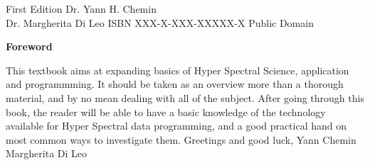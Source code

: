 \documentclass[10pt]{book}
\begin{document}
First Edition\newline\linebreak
Dr. Yann H. Chemin\\Dr. Margherita Di Leo\newline\linebreak
ISBN  XXX-X-XXX-XXXXX-X\newline\linebreak
Public Domain\newline
\newpage
\begin{center}
 \textbf{Foreword}
\end{center}
This textbook aims at expanding basics of Hyper Spectral Science, application and programmming.
It should be taken as an overview more than a thorough material, and by no mean dealing with all of the subject. 
\newline\linebreak
After going through this book, the reader will be able to have a basic knowledge of the technology available
for Hyper Spectral data programming, and a good practical hand on most common ways to investigate them.
\newline\linebreak
Greetings and good luck,\newline
Yann Chemin\\Margherita Di Leo\newline\linebreak

\tableofcontents

\newpage

\end{document}
